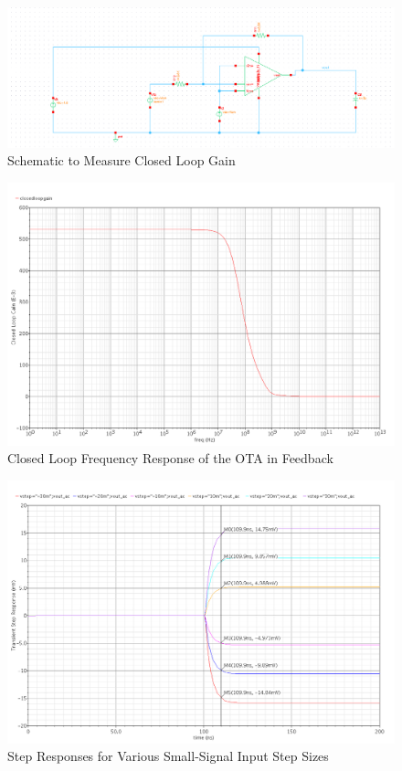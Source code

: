 \documentclass{article}
\begin{document}
\begin{figure}[H]
\centering
\includegraphics[width=7in]{bullet11_gainschem.png}
\caption{Schematic to Measure Closed Loop Gain}
\label{b11_gainschem}
\end{figure}

\begin{figure}[H]
\centering
\includegraphics[width=5.5in]{bullet11_gain.png}
\caption{Closed Loop Frequency Response of the OTA in Feedback}
\label{b11_gain}
\end{figure}

\begin{figure}[H]
\centering
\includegraphics[width=5.5in]{bullet11_step.png}
\caption{Step Responses for Various Small-Signal Input Step Sizes}
\label{b11_step}
\end{figure}
\end{document}
